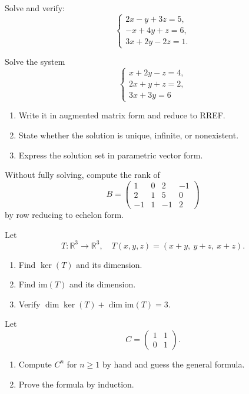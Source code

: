 \documentclass[11pt]{article}
\begin{document}
\begin{problem}
Solve and verify:
\[
\begin{cases}
2x-y+3z=5,\\
-x+4y+z=6,\\
3x+2y-2z=1.
\end{cases}
\]
\end{problem}
\begin{problem}
Solve the system
\[
\begin{cases}
x + 2y - z = 4, \\
2x + y + z = 2, \\
3x + 3y = 6
\end{cases}
\]
\begin{enumerate}
    \item Write it in augmented matrix form and reduce to RREF.
    \item State whether the solution is unique, infinite, or nonexistent.
    \item Express the solution set in parametric vector form.
\end{enumerate}
\end{problem}
\begin{problem}
Without fully solving, compute the rank of
\[
B =
\begin{pmatrix}
1 & 0 & 2 & -1 \\
2 & 1 & 5 & 0 \\
-1 & 1 & -1 & 2
\end{pmatrix}
\]
by row reducing to echelon form.
\end{problem}

\begin{problem}
Let
\[
T: \mathbb{R}^3 \to \mathbb{R}^3, \quad
T(x,y,z) = (x + y, \ y + z, \ x + z).
\]
\begin{enumerate}
    \item Find $\ker(T)$ and its dimension.
    \item Find $\mathrm{im}(T)$ and its dimension.
    \item Verify $\dim \ker(T) + \dim \mathrm{im}(T) = 3$.
\end{enumerate}
\end{problem}

\begin{problem}
Let
\[
C =
\begin{pmatrix}
1 & 1 \\
0 & 1
\end{pmatrix}.
\]
\begin{enumerate}
    \item Compute $C^n$ for $n \geq 1$ by hand and guess the general formula.
    \item Prove the formula by induction.
\end{enumerate}
\end{problem}
\end{document}
